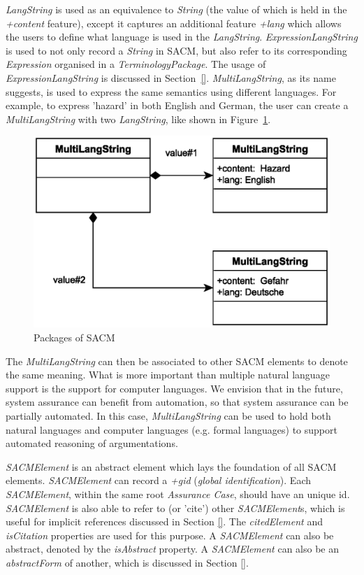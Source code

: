 \textit{LangString} is used as an equivalence to \textit{String} (the value of which is held in the \textit{+content} feature), except it captures an additional feature \textit{+lang} which allows the users to define what language is used in the \textit{LangString}. \textit{ExpressionLangString} is used to not only record a \textit{String} in SACM, but also refer to its corresponding \textit{Expression} organised in a \textit{TerminologyPackage}. The usage of \textit{ExpressionLangString} is discussed in Section~\ref{}. \textit{MultiLangString}, as its name suggests, is used to express the same semantics using different languages. For example, to express 'hazard' in both English and German, the user can create a \textit{MultiLangString} with two \textit{LangString}, like shown in Figure~\ref{fig:mulitiLang}.
\begin{figure}
	\centering
	\includegraphics[width=0.5\linewidth]{fig/MultiLangString.eps}
	\caption{Packages of SACM}
	\label{fig:mulitiLang}
\end{figure}
The \textit{MultiLangString} can then be associated to other SACM elements to denote the same meaning. What is more important than multiple natural language support is the support for computer languages. We envision that in the future, system assurance can benefit from automation, so that system assurance can be partially automated. In this case, \textit{MultiLangString} can be used to hold both natural languages and computer languages (e.g. formal languages) to support automated reasoning of argumentations. 

\textit{SACMElement} is an abstract element which lays the foundation of all SACM elements. \textit{SACMElement} can record a \textit{+gid} (\textit{global identification}). Each \textit{SACMElement}, within the same root \textit{Assurance Case}, should have an unique id. \textit{SACMElement} is also able to refer to (or 'cite') other \textit{SACMElement}s, which is useful for implicit references discussed in Section \ref{}. The \textit{citedElement} and \textit{isCitation} properties are used for this purpose. A \textit{SACMElement} can also be abstract, denoted by the \textit{isAbstract} property. A \textit{SACMElement} can also be an \textit{abstractForm} of another, which is discussed in Section \ref{}. 

